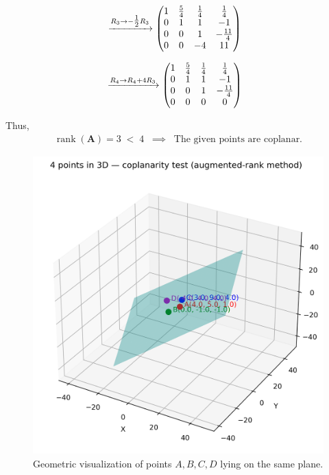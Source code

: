 \documentclass[12pt]{article}
\begin{document}
\begin{align}
&\xrightarrow{R_3 \to -\tfrac{1}{2}R_3}
\begin{pmatrix}
1 & \tfrac{5}{4} & \tfrac{1}{4} & \tfrac{1}{4} \\
0 & 1 & 1 & -1 \\
0 & 0 & 1 & -\tfrac{11}{4} \\
0 & 0 & -4 & 11
\end{pmatrix}
\end{align}

\begin{align}
&\xrightarrow{R_4 \to R_4 + 4R_3}
\begin{pmatrix}
1 & \tfrac{5}{4} & \tfrac{1}{4} & \tfrac{1}{4} \\
0 & 1 & 1 & -1 \\
0 & 0 & 1 & -\tfrac{11}{4} \\
0 & 0 & 0 & 0
\end{pmatrix}
\end{align}

Thus,
\begin{align}
\operatorname{rank}(\mathbf{A}) = 3 \;<\; 4 \;\;\implies\;\;
\text{The given points are coplanar.}
\end{align}

\newpage
\begin{figure}[H]
    \centering
    \includegraphics[width=0.55\linewidth]{figures/points_coplanarity.png}
    \caption{Geometric visualization of points $A, B, C, D$ lying on the same plane.}
    \label{fig:coplanarity}
\end{figure}
\end{document}
